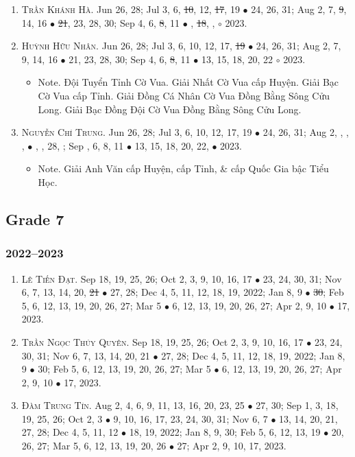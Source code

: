 \documentclass{article}
\begin{document}
\begin{enumerate}
	\item \textsc{Trần Khánh Hà.} {\sf[In]} Jun 26, 28; Jul 3, 6, \st{10}, 12, \st{17}, 19 $\bullet$ 24, 26, 31; Aug 2, 7, \st{9}, 14, 16 $\bullet$ \st{21}, 23, 28, 30; Sep 4, 6, \st{8}, 11 $\bullet$ , \st{18}, , $\circ$ 2023.
	\item \textsc{Huỳnh Hữu Nhân.} {\sf[In]} Jun 26, 28; Jul 3, 6, 10, 12, 17, \st{19} $\bullet$ 24, 26, 31; Aug 2, 7, 9, 14, 16 $\bullet$ 21, 23, 28, 30; Sep 4, 6, \st{8}, 11 $\bullet$ 13, 15, 18, 20, 22 $\circ$ 2023.
	\begin{itemize}
		\item {\sf Note.} Đội Tuyển Tỉnh Cờ Vua. Giải Nhất Cờ Vua cấp Huyện. Giải Bạc Cờ Vua cấp Tỉnh. Giải Đồng Cá Nhân Cờ Vua Đồng Bằng Sông Cửu Long. Giải Bạc Đồng Đội Cờ Vua Đồng Bằng Sông Cửu Long.
	\end{itemize}
	\item \textsc{Nguyễn Chí Trung.} {\sf[In]} Jun 26, 28; Jul 3, 6, 10, 12, 17, 19 $\bullet$ 24, 26, 31; Aug 2, , , ,  $\bullet$ , , 28, ; Sep , 6, 8, 11 $\bullet$ 13, 15, 18, 20, 22, $\bullet$ 2023.
	\begin{itemize}
		\item {\sf Note.} Giải Anh Văn cấp Huyện, cấp Tỉnh, \& cấp Quốc Gia bậc Tiểu Học.
	\end{itemize}
\end{enumerate}

\subsection{Grade 7}

\subsubsection{2022--2023}

\begin{enumerate}
	\item \textsc{Lê Tiến Đạt.} {\sf[In]} Sep 18, 19, 25, 26; Oct 2, 3, 9, 10, 16, 17 $\bullet$ 23, 24, 30, 31; Nov 6, 7, 13, 14, 20, \st{21} $\bullet$ 27, 28; Dec 4, 5, 11, 12, 18, 19, 2022; Jan 8, 9 $\bullet$ \st{30}; Feb 5, 6, 12, 13, 19, 20, 26, 27; Mar 5 $\bullet$ 6, 12, 13, 19, 20, 26, 27; Apr 2, 9, 10 $\bullet$ 17, 2023.
	\item \textsc{Trần Ngọc Thúy Quyên.} {\sf[In]} Sep 18, 19, 25, 26; Oct 2, 3, 9, 10, 16, 17 $\bullet$ 23, 24, 30, 31; Nov 6, 7, 13, 14, 20, 21 $\bullet$ 27, 28; Dec 4, 5, 11, 12, 18, 19, 2022; Jan 8, 9 $\bullet$ 30; Feb 5, 6, 12, 13, 19, 20, 26, 27; Mar 5 $\bullet$ 6, 12, 13, 19, 20, 26, 27; Apr 2, 9, 10 $\bullet$ 17, 2023.
	\item \textsc{Đàm Trung Tín.} {\sf[In]} Aug 2, 4, 6, 9, 11, 13, 16, 20, 23, 25 $\bullet$ 27, 30; Sep 1, 3, 18, 19, 25, 26; Oct 2, 3 $\bullet$ 9, 10, 16, 17, 23, 24, 30, 31; Nov 6, 7 $\bullet$ 13, 14, 20, 21, 27, 28; Dec 4, 5, 11, 12 $\bullet$ 18, 19, 2022; Jan 8, 9, 30; Feb 5, 6, 12, 13, 19 $\bullet$ 20, 26, 27; Mar 5, 6, 12, 13, 19, 20, 26 $\bullet$ 27; Apr 2, 9, 10, 17, 2023. {\sf[Out]}
\end{enumerate}
\end{document}
